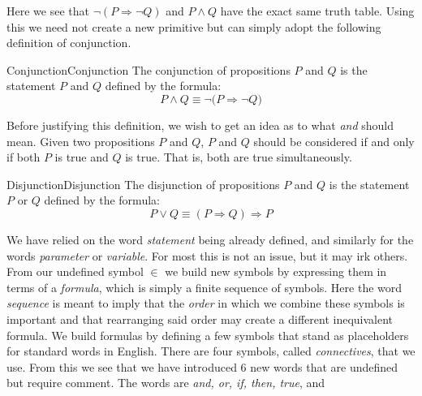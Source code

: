         Here we see that $\neg(P\Rightarrow\neg{Q})$ and $P\land{Q}$ have the
        exact same truth table. Using this we need not create a new primitive
        but can simply adopt the following definition of conjunction.
        \begin{fdefinition}{Conjunction}{Conjunction}
            The conjunction of propositions $P$ and $Q$ is the statement $P$ and
            $Q$ defined by the formula:
            \begin{equation*}
                P\land{Q}\equiv\neg\big(P\Rightarrow\neg{Q}\big)
            \end{equation*}
        \end{fdefinition}
        Before justifying this definition, we wish to get an idea as to what
        \textit{and} should mean. Given two propositions $P$ and $Q$, $P$ and
        $Q$ should be considered if and only if both $P$ is true and $Q$ is
        true. That is, both are true simultaneously.
        \par\hfill\par
        \begin{fdefinition}{Disjunction}{Disjunction}
            The disjunction of propositions $P$ and $Q$ is the statement $P$ or
            $Q$ defined by the formula:
            \begin{equation*}
                P\lor{Q}\equiv(P\Rightarrow{Q})\Rightarrow{P}
            \end{equation*}
        \end{fdefinition}
        We have relied on the word \textit{statement} being already defined, and
        similarly for the words \textit{parameter} or \textit{variable}. For most
        this is not an issue, but it may irk others. From our undefined symbol $\in$
        we build new symbols by expressing them in terms of a
        \textit{formula}, which is simply a finite
        sequence of symbols. Here the word \textit{sequence} is meant to imply that
        the \textit{order} in which we combine these symbols is important and that
        rearranging said order may create a different inequivalent formula. We build
        formulas by defining a few symbols that stand as placeholders for standard
        words in English. There are four symbols, called
        \textit{\glspl{connective}}, that we use.
        From this we see that we have introduced 6 new words that are undefined but
        require comment. The words are \textit{and, or, if, then, true}, and
